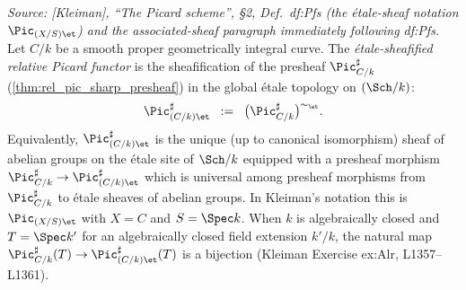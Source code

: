 \begin{definition}
  \textit{Source: [Kleiman], ``The Picard scheme'', \S 2,
  Def.~df:Pfs (the \'etale-sheaf notation \(\Pic_{(X/S)\et}\)) and the
  associated-sheaf paragraph immediately following df:Pfs.}
  Let \(C/k\) be a smooth proper geometrically integral curve. The
  \emph{\'etale-sheafified relative Picard functor} is the sheafification of
  the presheaf \(\Pic^\sharp_{C/k}\) (\cref{thm:rel_pic_sharp_presheaf}) in the
  global \'etale topology on \((\Sch/k)\):
  \[
    \Pic^\sharp_{(C/k)\et} \;\;:=\;\;
       \bigl(\Pic^\sharp_{C/k}\bigr)^{\sim_{\et}}.
  \]
  Equivalently, \(\Pic^\sharp_{(C/k)\et}\) is the unique (up to canonical
  isomorphism) sheaf of abelian groups on the \'etale site of \(\Sch/k\)
  equipped with a presheaf morphism $\Pic^\sharp_{C/k} \to
  \Pic^\sharp_{(C/k)\et}$ which is universal among presheaf morphisms from
  \(\Pic^\sharp_{C/k}\) to \'etale sheaves of abelian groups. In Kleiman's
  notation this is \(\Pic_{(X/S)\et}\) with \(X = C\) and \(S = \Spec k\). When \(k\)
  is algebraically closed and \(T = \Spec k'\) for an algebraically closed field
  extension \(k'/k\), the natural map
  \(\Pic^\sharp_{C/k}(T) \to \Pic^\sharp_{(C/k)\et}(T)\) is a bijection (Kleiman
  Exercise ex:Alr, L1357--L1361).
\end{definition}


